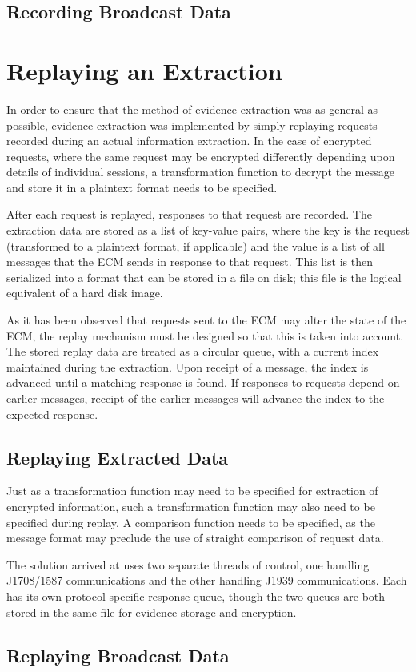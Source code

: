 \subsection{Recording Broadcast Data}



\section{Replaying an Extraction}

In order to ensure that the method of evidence extraction was as general as possible, evidence extraction was implemented
by simply replaying requests recorded during an actual information extraction. In the case of encrypted requests, where
the same request may be encrypted differently depending upon details of individual sessions, a transformation function
to decrypt the message and store it in a plaintext format needs to be specified.

After each request is replayed, responses to that request are recorded. The extraction data are stored as a list of 
key-value pairs, where the key is the request (transformed to a plaintext format, if applicable) and the value is
a list of all messages that the ECM sends in response to that request. This list is then serialized into a format
that can be stored in a file on disk; this file is the logical equivalent of a hard disk image.

As it has been observed that requests sent to the ECM may alter the state of the ECM, the replay mechanism must
be designed so that this is taken into account. The stored replay data are treated as a circular queue, with a current
index maintained during the extraction. Upon receipt of a message, the index is advanced until a matching response is found.
If responses to requests depend on earlier messages, receipt of the earlier messages will advance the index to
the expected response.

\subsection{Replaying Extracted Data}

Just as a transformation function may need to be specified for extraction of encrypted information, such a transformation
function may also need to be specified during replay. A comparison function needs to be specified, as the message format may
preclude the use of straight comparison of request data.

The solution arrived at uses two separate threads of control, one handling J1708/1587 communications and the other
handling J1939 communications. Each has its own protocol-specific response queue, though the two queues are both
stored in the same file for evidence storage and encryption.

\subsection{Replaying Broadcast Data}
